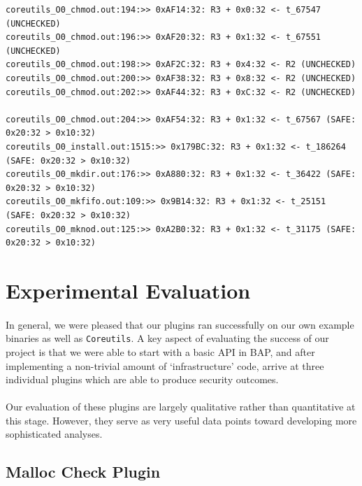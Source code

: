\documentclass[letterpaper,11pt]{article}
\begin{document}
\small
\begin{verbatim}
coreutils_O0_chmod.out:194:>> 0xAF14:32: R3 + 0x0:32 <- t_67547 (UNCHECKED)
coreutils_O0_chmod.out:196:>> 0xAF20:32: R3 + 0x1:32 <- t_67551 (UNCHECKED)
coreutils_O0_chmod.out:198:>> 0xAF2C:32: R3 + 0x4:32 <- R2 (UNCHECKED)
coreutils_O0_chmod.out:200:>> 0xAF38:32: R3 + 0x8:32 <- R2 (UNCHECKED)
coreutils_O0_chmod.out:202:>> 0xAF44:32: R3 + 0xC:32 <- R2 (UNCHECKED)

coreutils_O0_chmod.out:204:>> 0xAF54:32: R3 + 0x1:32 <- t_67567 (SAFE: 0x20:32 > 0x10:32)
coreutils_O0_install.out:1515:>> 0x179BC:32: R3 + 0x1:32 <- t_186264 (SAFE: 0x20:32 > 0x10:32)
coreutils_O0_mkdir.out:176:>> 0xA880:32: R3 + 0x1:32 <- t_36422 (SAFE: 0x20:32 > 0x10:32)
coreutils_O0_mkfifo.out:109:>> 0x9B14:32: R3 + 0x1:32 <- t_25151 (SAFE: 0x20:32 > 0x10:32)
coreutils_O0_mknod.out:125:>> 0xA2B0:32: R3 + 0x1:32 <- t_31175 (SAFE: 0x20:32 > 0x10:32)
\end{verbatim}
\normalsize


\section{Experimental Evaluation}

\paragraph{}
In general, we were pleased that our plugins ran successfully on our own
example binaries as well as \texttt{Coreutils}. A key aspect of evaluating
the success of our project is that we were able to start with a basic API in
BAP, and after implementing a non-trivial amount of `infrastructure' code,
arrive at three individual plugins which are able to produce security outcomes.

\paragraph{}
Our evaluation of these plugins are largely qualitative rather than
quantitative at this stage. However, they serve as very useful data points
toward developing more sophisticated analyses.

\subsection{Malloc Check Plugin}
\end{document}
